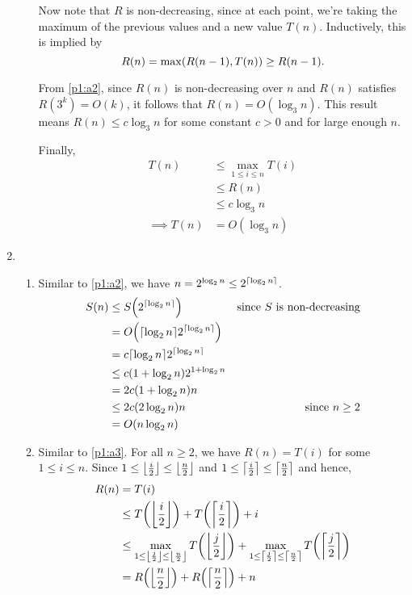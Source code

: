 \documentclass[12pt,a4paper]{article}
\begin{document}
\begin{enumerate}[label=(\alph*)]
\begin{enumerate}[label=(\roman*)]
				Now note that $R$ is non-decreasing, since at each point, we're taking the maximum of the previous values and a new value $T(n)$. Inductively, this is implied by
				$$R(n) = \max\parens*{R(n - 1), T(n)} \ge R(n - 1).$$

				From \ref{p1:a2}, since $R(n)$ is non-decreasing over $n$ and $R(n)$ satisfies $R(3^k) = O(k)$, it follows that $R(n) = O(\log_3 n)$. This result means $R(n) \le c\log_3 n$ for some constant $c > 0$ and for large enough $n$.

				Finally,
				\begin{align*}
					T(n) &\le \max_{1 \le i \le n}T(i) \\
					&\le R(n) \\
					&\le c\log_3 n \\
					\implies T(n) &= O(\log_3 n)
				\end{align*}

			\end{enumerate}

			\item
			\begin{enumerate}[label=(\roman*)]
				\item \label{p1:b5}
				Similar to \ref{p1:a2}, we have $n = 2^{\log_2 n} \le 2^{\ceil*{\log_2 n}}$.
				\begin{align*}
					S(n) &\le S\parens*{2^{\ceil*{\log_2 n}}} & \text{since $S$ is non-decreasing}\\
					&= O\parens*{\ceil*{\log_2 n} 2^{\ceil*{\log_2 n}}} \\
					&= c\ceil*{\log_2 n} 2^{\ceil*{\log_2 n}} \\
					&\le c\parens{1 + \log_2 n} 2^{1 + \log_2 n} \\
					&= 2c\parens{1 + \log_2 n}n \\
					&\le 2c\parens{2\log_2 n}n & \text{since $n \ge 2$} \\
					&= O\parens{n \log_2 n}
				\end{align*}

				\item \label{p1:b6}
				Similar to \ref{p1:a3}.
				For all $n \ge 2$, we have $R(n) = T(i)$ for some $1 \le i \le n$. Since $1 \le \floor*{\frac{i}{2}} \le \floor*{\frac{n}{2}}$ and $1 \le \ceil*{\frac{i}{2}} \le \ceil*{\frac{n}{2}}$ and hence,
				\begin{align*}
					R(n) &= T(i) \\
					&\le T\parens*{ \floor*{\frac{i}{2}} } + T\parens*{ \ceil*{\frac{i}{2}} } + i \\
					&\le \max_{1 \le \floor*{\frac{j}{2}} \le \floor*{\frac{n}{2}}} T\parens*{ \floor*{\frac{j}{2}} }
					 	+ \max_{1 \le \ceil*{\frac{j}{2}} \le \ceil*{\frac{n}{2}}} T\parens*{ \ceil*{\frac{j}{2}} } \\
					&= R\parens*{ \floor*{\frac{n}{2}} } + R\parens*{ \ceil*{\frac{n}{2}} } + n
				\end{align*}


\end{enumerate}
\end{enumerate}
\end{document}
